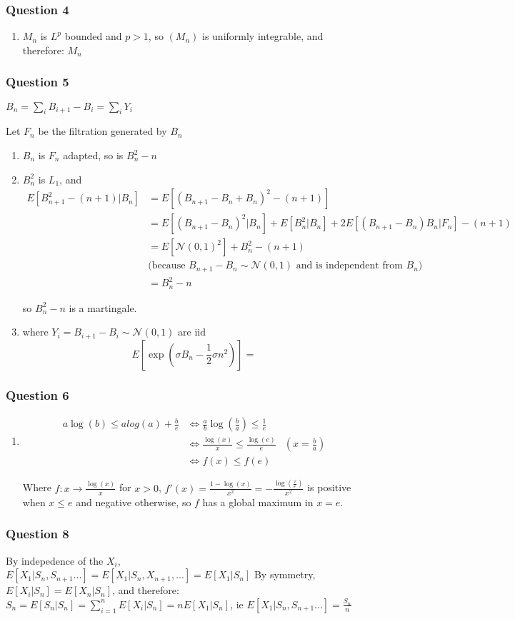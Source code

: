 \documentclass[12pt]{article}
\newcommand{\Q}[1]{\subsubsection*{Question #1}}
\begin{document}
\Q{4}
\begin{enumerate}
\item $M_n$ is $L^p$ bounded and $p > 1$, so $(M_n)$ is uniformly integrable, and therefore: $M_n$


\end{enumerate}

\Q{5}
$B_n = \sum_i B_{i+1} - B_i = \sum_i Y_i$

Let $F_n$ be the filtration generated by $B_n$
\begin{enumerate}
\item $B_n$ is $F_n$ adapted, so is $B_n^2-n$
\item $B_n^2$ is $L_1$, and
  \begin{align*}
    E[B_{n+1}^2-(n+1) | B_n]
    &= E[(B_{n+1} - B_n + B_n)^2 - (n+1)]
    \\&= E[(B_{n+1} - B_n)^2 | B_n] + E[B_n^2|B_n] + 2 E[ (B_{n+1} - B_{n})B_n|F_n] - (n+1)
    \\& = E[ \mathcal N(0,1)^2 ] + B_n^2 - (n+1)
    \\&\text{(because  $B_{n+1}-B_n \sim \mathcal N(0,1)$ and is independent from $B_n$)}
    \\& = B_n^2 - n
  \end{align*}

so $B_n^2 - n$ is a martingale.

\item

  where $Y_i = B_{i+1} - B_i \sim \mathcal N(0,1)$ are iid
  $$E[\exp(\sigma B_n - \frac12 \sigma n^2)] =$$
  \end{enumerate}
\Q{6}
\begin{enumerate}
\item
  \begin{align*}
    a\log(b) \le a log(a) + \frac b e
    &\iff \frac a b \log(\frac b a) \le \frac 1 e
    \\ & \iff \frac{ \log(x) } x \le \frac {\log(e)} e & (x = \frac b a)
    \\ & \iff f(x) \le f(e)
  \end{align*}

  Where $f:x \rightarrow \frac{\log(x)}x$ for $x > 0$,
  $f'(x) = \frac {1 - \log(x)} {x^2} = - \frac { \log(\frac x e)}
  {x^2}$
  is positive when $x \le e$ and negative otherwise, so $f$ has a
  global maximum in $x = e$.


  
\end{enumerate}
\Q{8}
By indepedence of the $X_i$, $E[X_1 | S_n, S_{n+1}...] = E[X_1 | S_n, X_{n+1}, ...] = E[X_1 | S_n]$
By symmetry, $E[X_i|S_n] = E[X_n | S_n]$, and therefore:
$S_n = E[S_n | S_n] = \sum_{i=1}^n E[X_i | S_n] = n E[X_1 | S_n]$,
ie $E[X_1 | S_n, S_{n+1}...] = \frac{S_n}{n}$
\end{document}
